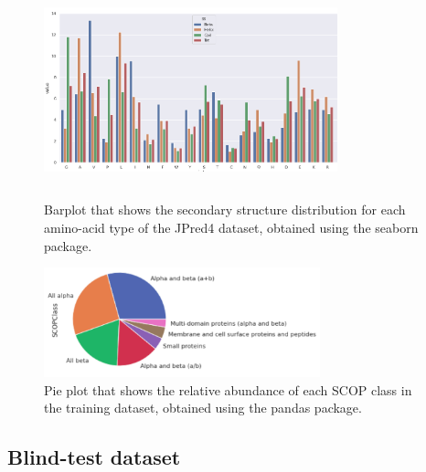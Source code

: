 \documentclass[nocrop]{bioinfo}
\begin{document}
\begin{methods}
\begin{figure}[!h]%
        \begin{minipage}{0.45\textwidth}
        \centering
        \includegraphics[width=8.5cm, height=5.5cm]{./plotsJPred4/aa_composition_per_ss.png}
        \vspace{-20pt}
        \caption{Barplot that shows the secondary structure distribution for each amino-acid type of the JPred4 dataset, obtained using the seaborn package.}\label{fig:04}
        \end{minipage}\hfill
        \begin{minipage}{0.45\textwidth}
        \vspace{+30pt}
        \centering
        \includegraphics[width=8cm]{./plotsJPred4/SCOPClass.png}
        \vspace{+20pt}
        \caption{Pie plot that shows the relative abundance of each SCOP class in the training dataset, obtained using the pandas package.}\label{fig:05}
        \end{minipage}
\end{figure}

\subsection{Blind-test dataset}

\end{methods}
\end{document}
